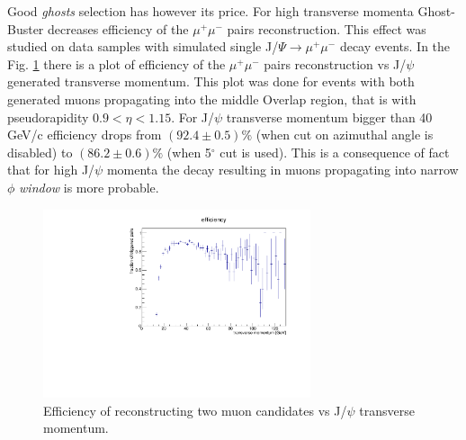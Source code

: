 Good \textit{ghosts} selection has however its price. For high transverse momenta Ghost-Buster decreases efficiency of the $\mu^{+}\mu^{-}$ pairs reconstruction. This effect was studied on data samples with simulated single J/$\Psi \rightarrow \mu^{+}\mu^{-}$ decay events. In the Fig. \ref{divmom} there is a plot of efficiency of the $\mu^{+}\mu^{-}$ pairs reconstruction vs J/$\psi$ generated transverse momentum. This plot was done for events with both generated muons propagating into the middle Overlap region, that is with pseudorapidity $0.9 < \eta < 1.15$. For J/$\psi$ transverse momentum bigger than 40 GeV/c efficiency drops from $(92.4\pm0.5)\%$ (when cut on azimuthal angle is disabled) to $(86.2\pm0.6)\%$ (when 5$^\circ$\textrm{ }cut is used). This is a consequence of fact that for high J/$\psi$ momenta the decay resulting in muons propagating into narrow $\phi$ \textit{window} is more probable.
\begin{figure}[t]
\centering
\includegraphics[width=0.7\textwidth]{efficiency_GB_5.pdf}
\caption{Efficiency of reconstructing two muon candidates vs J/$\psi$ transverse momentum.}
\label{divmom}
\end{figure} 
